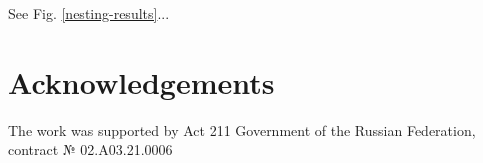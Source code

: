 \documentclass{../download/tPRS2e}
\begin{document}
See Fig. \ref{nesting-results}...

\section*{Acknowledgements}

The work was supported by Act 211 Government of the Russian Federation, contract № 02.A03.21.0006


\nocite{*}

\end{document}
